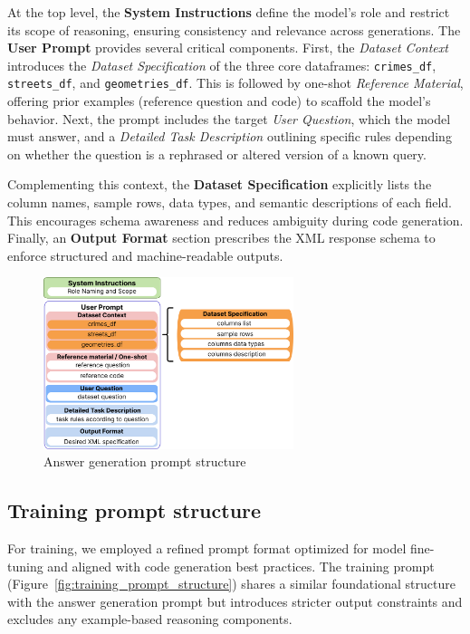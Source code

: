 At the top level, the \textbf{System Instructions} define the model’s role and restrict its scope of reasoning, ensuring consistency and relevance across generations. The \textbf{User Prompt} provides several critical components. First, the \textit{Dataset Context} introduces the \textit{Dataset Specification} of the three core dataframes: \texttt{crimes\_df}, \texttt{streets\_df}, and \texttt{geometries\_df}. This is followed by one-shot \textit{Reference Material}, offering prior examples (reference question and code) to scaffold the model’s behavior. Next, the prompt includes the target \textit{User Question}, which the model must answer, and a \textit{Detailed Task Description} outlining specific rules depending on whether the question is a rephrased or altered version of a known query.

Complementing this context, the \textbf{Dataset Specification} explicitly lists the column names, sample rows, data types, and semantic descriptions of each field. This encourages schema awareness and reduces ambiguity during code generation. Finally, an \textbf{Output Format} section prescribes the XML response schema to enforce structured and machine-readable outputs.

\begin{figure}[hbtp]
  \centering
  \includegraphics[width=0.65\textwidth]{images/answer_gen.png}
  \caption{Answer generation prompt structure}
  \label{fig:answer_generation_prompt_structure}
\end{figure}


\subsection{Training prompt structure}

For training, we employed a refined prompt format optimized for model fine-tuning and aligned with code generation best practices. The training prompt (Figure~\ref{fig:training_prompt_structure}) shares a similar foundational structure with the answer generation prompt but introduces stricter output constraints and excludes any example-based reasoning components.

